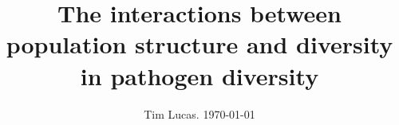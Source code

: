 \documentclass[a4paper,10pt,reqno]{amsart}
\begin{document}
\title{The interactions between population structure and diversity in pathogen diversity}
\author{Tim Lucas. \today}
\date{}

\maketitle







\small
\printbibliography 
\end{document}
